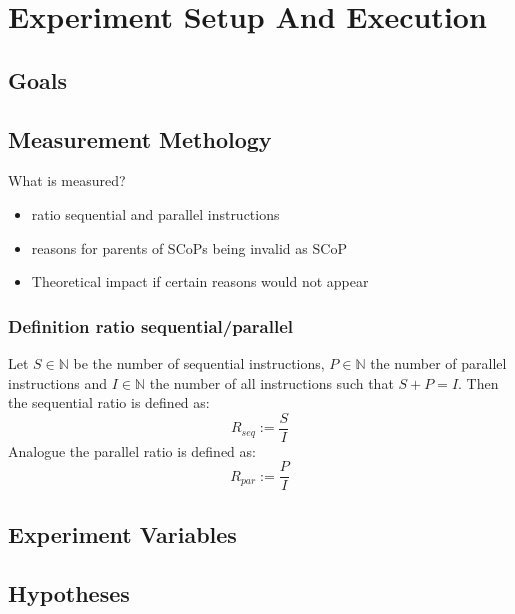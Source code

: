 \chapter{Experiment Setup And Execution}
\section{Goals}

\section{Measurement Methology}
What is measured?
\begin{itemize}
    \item ratio sequential and parallel instructions
    \item reasons for parents of SCoPs being invalid as SCoP
    \item Theoretical impact if certain reasons would not appear
\end{itemize}
\subsection{Definition ratio sequential/parallel}
Let \(S\in\mathbb{N}\) be the number of sequential instructions, \(P\in\mathbb{N}\) the number of parallel instructions and \(I\in\mathbb{N}\) the number of all instructions such that \(S + P = I\).
Then the sequential ratio is defined as:
\[R_{seq} := \frac{S}{I}\]
Analogue the parallel ratio is defined as:
\[R_{par} := \frac{P}{I}\]

\section{Experiment Variables}

\section{Hypotheses}

